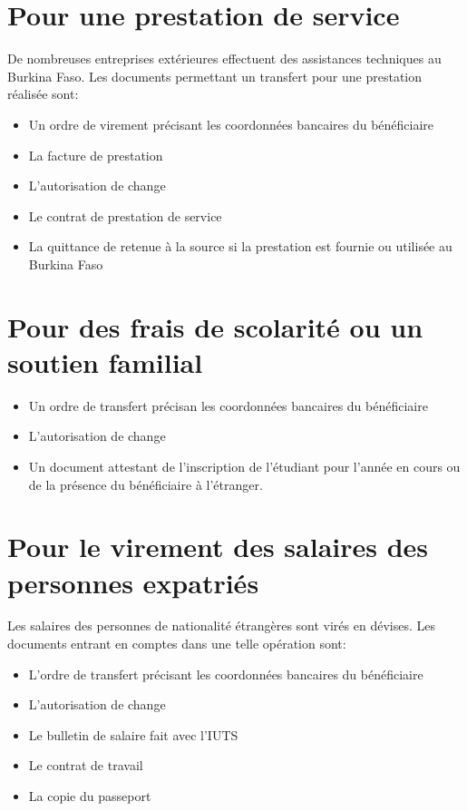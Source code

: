 \section{Pour une prestation de service}
De nombreuses entreprises extérieures effectuent des assistances techniques au Burkina
Faso. Les documents permettant un transfert pour une prestation réalisée sont:
\begin{itemize}
  \item Un ordre de virement précisant les coordonnées bancaires du bénéficiaire
  \item La facture de prestation
  \item L'autorisation de change
  \item Le contrat de prestation de service
  \item La quittance de retenue à la source si la prestation est fournie ou
    utilisée au Burkina Faso
\end{itemize}


\section{Pour des frais de scolarité ou un soutien familial}
\begin{itemize}
  \item Un ordre de transfert précisan les coordonnées bancaires du bénéficiaire
  \item L'autorisation de change
  \item Un document attestant de l'inscription de l'étudiant pour
    l'année en cours ou de la présence du bénéficiaire à l'étranger.
\end{itemize}

\section{Pour le virement des salaires des personnes expatriés}
Les salaires des personnes de nationalité étrangères sont virés en dévises. Les
documents entrant en comptes dans une telle opération sont:
\begin{itemize}
  \item L'ordre de transfert précisant les coordonnées bancaires du bénéficiaire
  \item L'autorisation de change
  \item Le bulletin de salaire fait avec l'IUTS
  \item Le contrat de travail
  \item La copie du passeport
\end{itemize}






